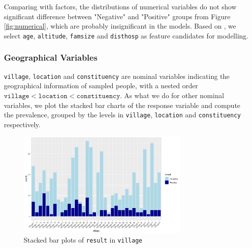 \documentclass[11pt,twoside]{article}
\numberwithin{Theorem}{section}
\numberwithin{Definition}{section}
\numberwithin{Lemma}{section}
\numberwithin{Algorithm}{section}
\numberwithin{equation}{section}
\begin{document}
Comparing with factors, the distributions of numerical variables do not show significant difference between "Negative" and "Positive" groups from Figure \ref{fig:numerical}, which are probably insignificant in the models. Based on \cite{goarant2016}, we select \texttt{age}, \texttt{altitude}, \texttt{famsize} and \texttt{disthosp} as feature candidates for modelling. 

\subsubsection{Geographical Variables}

\texttt{village}, \texttt{location} and \texttt{constituency} are nominal variables indicating the geographical information of sampled people, with a nested order $\texttt{village} < \texttt{location} < \texttt{constituency}$.  As what we do for other nominal variables, we plot the stacked bar charts of the response variable and compute the prevalence, grouped by the levels in \texttt{village}, \texttt{location} and \texttt{constituency} respectively. 

\begin{figure}[!h]
	\centering
	\includegraphics[width = 0.75\textwidth]{Images/village.png}
	\caption{Stacked bar plots of \texttt{result} in \texttt{village}}
	\label{fig:village} 
\end{figure}
\end{document}
